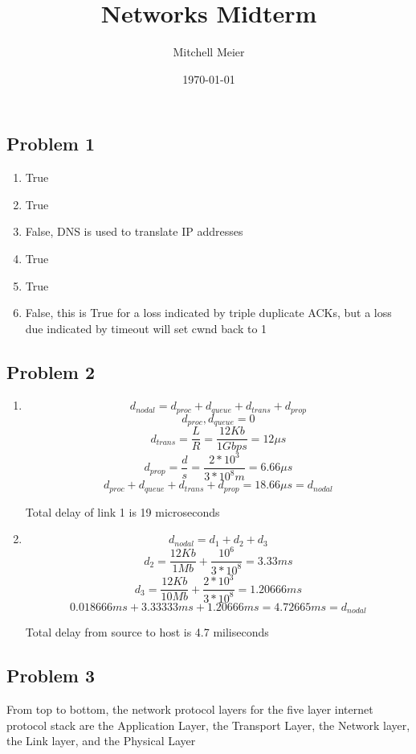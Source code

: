 \documentclass[14pt]{article}
\title{Networks Midterm}
\author{Mitchell Meier}
\date{\today}
\begin{document}
\maketitle

\subsection*{Problem 1}

\begin{enumerate}
\item True \item True \item False, DNS is used to translate IP addresses \item True \item True \item False, this is True for a loss indicated by triple duplicate ACKs, but a loss due indicated by timeout will set cwnd back to 1
\end{enumerate}

\subsection*{Problem 2}
\begin{enumerate}
\item
\[ d_{nodal} = d_{proc} + d_{queue} + d_{trans} + d_{prop} \]
\[ d_{proc}, d_{queue} = 0  \]
\[ d_{trans} = \frac{L}{R} = \frac{12Kb}{1Gbps} = 12\mu s \]
\[ d_{prop} = \frac{d}{s} = \frac{2*10^3}{3*10^8m}  = 6.66\mu s \]
\[ d_{proc} + d_{queue} + d_{trans} + d_{prop} = 18.66\mu s = d_{nodal} \]

Total delay of link 1 is 19 microseconds
\pagebreak

\item
\[ d_{nodal} = d_1 + d_2 + d_3 \]
\[ d_2 =  \frac{12Kb}{1Mb} + \frac{10^6}{3*10^8} = 3.33ms \]
\[ d_3 = \frac{12Kb}{10Mb} + \frac{2*10^3}{3*10^8} = 1.20666ms \]
\[ 0.018666ms + 3.33333ms + 1.20666ms = 4.72665ms = d_{nodal} \]

Total delay from source to host is 4.7 miliseconds
\end{enumerate}


\subsection*{Problem 3}
From top to bottom, the network protocol layers for the five layer internet protocol stack are the Application Layer, the Transport Layer, the Network layer, the Link layer, and the Physical Layer \\
\end{document}
